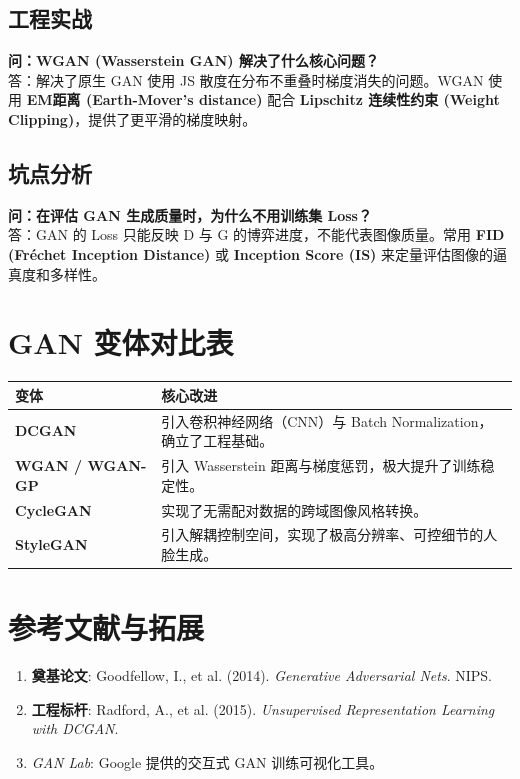 \documentclass[12pt, a4paper]{article}
\begin{document}
\subsection{工程实战}
\textbf{问：WGAN (Wasserstein GAN) 解决了什么核心问题？}\\
答：解决了原生 GAN 使用 JS 散度在分布不重叠时梯度消失的问题。WGAN 使用 \textbf{EM距离 (Earth-Mover's distance)} 配合 \textbf{Lipschitz 连续性约束 (Weight Clipping)}，提供了更平滑的梯度映射。

\subsection{坑点分析}
\textbf{问：在评估 GAN 生成质量时，为什么不用训练集 Loss？}\\
答：GAN 的 Loss 只能反映 D 与 G 的博弈进度，不能代表图像质量。常用 \textbf{FID (Fréchet Inception Distance)} 或 \textbf{Inception Score (IS)} 来定量评估图像的逼真度和多样性。

\section{GAN 变体对比表}

\begin{table}[h]
\centering
\begin{tabularx}{\textwidth}{|l|X|}
\hline
\textbf{变体} & \textbf{核心改进} \\
\hline
\textbf{DCGAN} & 引入卷积神经网络（CNN）与 Batch Normalization，确立了工程基础。 \\
\hline
\textbf{WGAN / WGAN-GP} & 引入 Wasserstein 距离与梯度惩罚，极大提升了训练稳定性。 \\
\hline
\textbf{CycleGAN} & 实现了无需配对数据的跨域图像风格转换。 \\
\hline
\textbf{StyleGAN} & 引入解耦控制空间，实现了极高分辨率、可控细节的人脸生成。 \\
\hline
\end{tabularx}
\end{table}

\section{参考文献与拓展}
\begin{enumerate}
    \item \textbf{奠基论文}: Goodfellow, I., et al. (2014). \textit{Generative Adversarial Nets}. NIPS.
    \item \textbf{工程标杆}: Radford, A., et al. (2015). \textit{Unsupervised Representation Learning with DCGAN}.
    \item \textit{GAN Lab}: Google 提供的交互式 GAN 训练可视化工具。
\end{enumerate}
\end{document}
